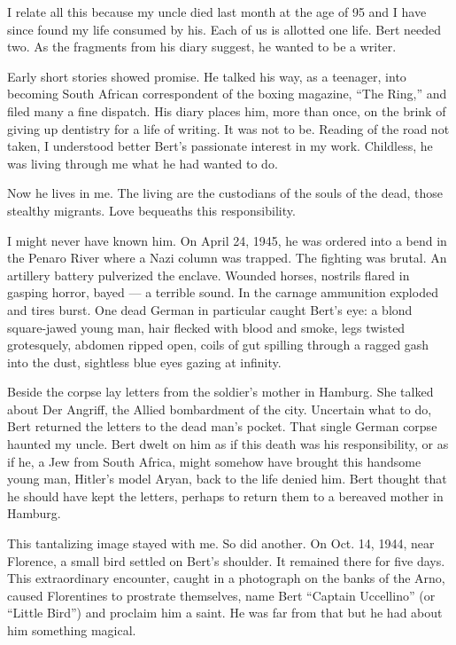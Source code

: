 I relate all this because my uncle died last month at the age of 95 and
I have since found my life consumed by his. Each of us is allotted one
life. Bert needed two. As the fragments from his diary suggest, he
wanted to be a writer.

Early short stories showed promise. He talked his way, as a teenager,
into becoming South African correspondent of the boxing magazine, ``The
Ring,'' and filed many a fine dispatch. His diary places him, more than
once, on the brink of giving up dentistry for a life of writing. It was
not to be. Reading of the road not taken, I understood better Bert's
passionate interest in my work. Childless, he was living through me what
he had wanted to do.

Now he lives in me. The living are the custodians of the souls of the
dead, those stealthy migrants. Love bequeaths this responsibility.

I might never have known him. On April 24, 1945, he was ordered into a
bend in the Penaro River where a Nazi column was trapped. The fighting
was brutal. An artillery battery pulverized the enclave. Wounded horses,
nostrils flared in gasping horror, bayed --- a terrible sound. In the
carnage ammunition exploded and tires burst. One dead German in
particular caught Bert's eye: a blond square-jawed young man, hair
flecked with blood and smoke, legs twisted grotesquely, abdomen ripped
open, coils of gut spilling through a ragged gash into the dust,
sightless blue eyes gazing at infinity.

Beside the corpse lay letters from the soldier's mother in Hamburg. She
talked about Der Angriff, the Allied bombardment of the city. Uncertain
what to do, Bert returned the letters to the dead man's pocket. That
single German corpse haunted my uncle. Bert dwelt on him as if this
death was his responsibility, or as if he, a Jew from South Africa,
might somehow have brought this handsome young man, Hitler's model
Aryan, back to the life denied him. Bert thought that he should have
kept the letters, perhaps to return them to a bereaved mother in
Hamburg.

This tantalizing image stayed with me. So did another. On Oct. 14, 1944,
near Florence, a small bird settled on Bert's shoulder. It remained
there for five days. This extraordinary encounter, caught in a
photograph on the banks of the Arno, caused Florentines to prostrate
themselves, name Bert ``Captain Uccellino'' (or ``Little Bird'') and
proclaim him a saint. He was far from that but he had about him
something magical.

